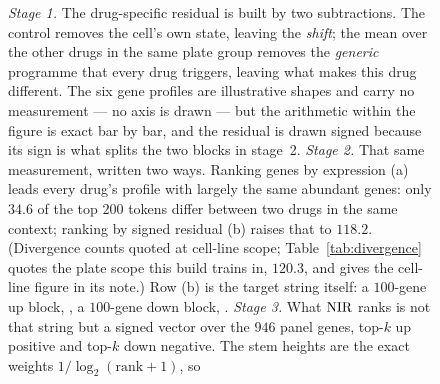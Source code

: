 \begin{figure}[htbp]
\begin{fullwidth}
\caption[The residual, the target string and the scored vector]{
\emph{Stage 1.} The drug-specific residual is built by two subtractions. The
control removes the cell's own state, leaving the \emph{shift}; the mean over
the other drugs in the same plate group removes the \emph{generic} programme
that every drug triggers, leaving what makes this drug different. The six
gene profiles are illustrative shapes and carry no measurement --- no axis is
drawn --- but the arithmetic within the figure is exact bar by bar, and the
residual is drawn signed because its sign is what splits the two blocks in
stage~2. \emph{Stage 2.} That same measurement, written two ways. Ranking genes
by expression (a) leads every drug's profile with largely the same abundant
genes: only $34.6$ of the top $200$ tokens differ between two drugs in the same
context; ranking by signed residual
(b) raises that to $118.2$. (Divergence counts quoted at cell-line scope; Table~\ref{tab:divergence} quotes the plate scope this build trains in, $120.3$, and gives the cell-line figure in its note.) Row (b) is the
target string itself: a $100$-gene up block, \DOWN, a $100$-gene down block,
\ENDCELL. \emph{Stage 3.} What $\textrm{NIR}$ ranks is not that string but a signed
vector over the $946$ panel genes, top-$k$ up positive and top-$k$ down
negative. The stem heights are the exact weights $1/\log_2(\textrm{rank}+1)$, so
}
\end{fullwidth}
\end{figure}

